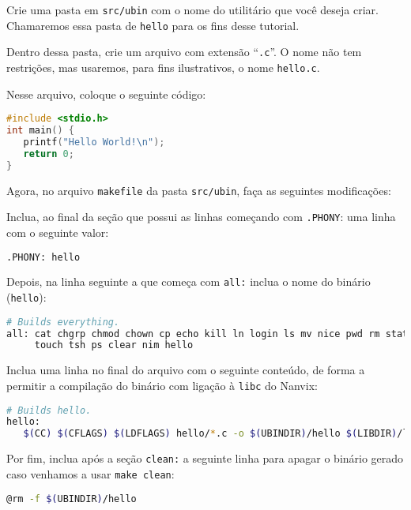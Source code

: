 \documentclass[11pt]{article}
\begin{document}
\begin{legal}
	\item Crie uma pasta em \texttt{src/ubin} com o nome do utilitário que você deseja criar. Chamaremos essa pasta de \texttt{hello} para os fins desse tutorial.
	\item Dentro dessa pasta, crie um arquivo com extensão ``\texttt{.c}''. O nome não tem restrições, mas usaremos, para fins ilustrativos, o nome \texttt{hello.c}.
	\item Nesse arquivo, coloque o seguinte código:

\begin{lstlisting}[language=c,numbers=none,frame=single]
#include <stdio.h>
int main() {
   printf("Hello World!\n");
   return 0;
}
\end{lstlisting}

	\item Agora, no arquivo \texttt{makefile} da pasta \texttt{src/ubin}, faça as seguintes modificações:

	\begin{legal}
		\item Inclua, ao final da seção que possui as linhas começando com \texttt{.PHONY}: uma linha com o seguinte valor:

\begin{lstlisting}[language=bash,numbers=none,frame=single]
.PHONY: hello
\end{lstlisting}

		\item Depois, na linha seguinte a que começa com \texttt{all:} inclua o nome do binário (\texttt{hello}):

\begin{lstlisting}[language=bash,numbers=none,frame=single]
# Builds everything.
all: cat chgrp chmod chown cp echo kill ln login ls mv nice pwd rm stat sync \
     touch tsh ps clear nim hello
\end{lstlisting}
	
	\item Inclua uma linha no final do arquivo com o seguinte conteúdo, de forma a permitir a compilação do binário com ligação  à \texttt{libc} do Nanvix:

\begin{lstlisting}[language=bash,numbers=none,frame=single]
# Builds hello.
hello:
   $(CC) $(CFLAGS) $(LDFLAGS) hello/*.c -o $(UBINDIR)/hello $(LIBDIR)/libc.a
\end{lstlisting}

	\item Por fim, inclua após a seção \texttt{clean:} a seguinte linha para apagar o binário gerado caso venhamos a usar \texttt{make clean}:

\begin{lstlisting}[language=bash,numbers=none,frame=single]
@rm -f $(UBINDIR)/hello
\end{lstlisting}
	\end{legal}
\end{legal}
\end{document}
